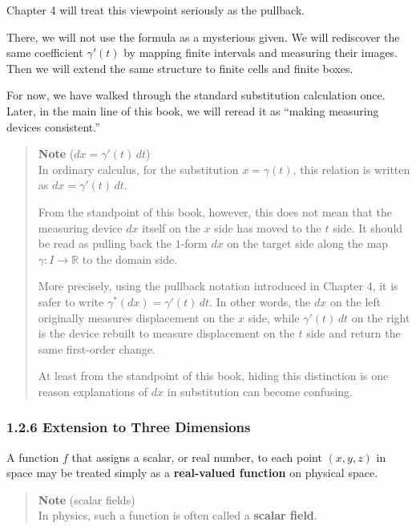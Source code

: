 Chapter 4 will treat this viewpoint seriously as the pullback.

There, we will not use the formula as a mysterious given. We will
rediscover the same coefficient \(\gamma'(t)\) by mapping finite
intervals and measuring their images. Then we will extend the same
structure to finite cells and finite boxes.

For now, we have walked through the standard substitution calculation
once. Later, in the main line of this book, we will reread it as
``making measuring devices consistent.''

\begin{quote}
\textbf{Note} (\(dx=\gamma'(t)\,dt\))\\
In ordinary calculus, for the substitution \(x=\gamma(t)\), this
relation is written as \(dx=\gamma'(t)\,dt\).

From the standpoint of this book, however, this does not mean that the
measuring device \(dx\) itself on the \(x\) side has moved to the \(t\)
side. It should be read as pulling back the \(1\)-form \(dx\) on the
target side along the map \(\gamma:I\to\mathbb{R}\) to the domain side.

More precisely, using the pullback notation introduced in Chapter 4, it
is safer to write \(\gamma^\ast(dx)=\gamma'(t)\,dt\). In other words,
the \(dx\) on the left originally measures displacement on the \(x\)
side, while \(\gamma'(t)\,dt\) on the right is the device rebuilt to
measure displacement on the \(t\) side and return the same first-order
change.

At least from the standpoint of this book, hiding this distinction is
one reason explanations of \(dx\) in substitution can become confusing.
\end{quote}

\hypertarget{extension-to-three-dimensions}{%
\subsubsection{1.2.6 Extension to Three
Dimensions}\label{extension-to-three-dimensions}}

A function \(f\) that assigns a scalar, or real number, to each point
\((x,y,z)\) in space may be treated simply as a
\textbf{real-valued function} on physical space.

\begin{quote}
\textbf{Note} (scalar fields)\\
In physics, such a function is often called a \textbf{scalar field}.
\end{quote}

